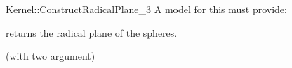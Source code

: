 \begin{ccRefFunctionObjectConcept}{Kernel::ConstructRadicalPlane_3}
A model for this must provide:


       {returns the radical plane of the spheres.
	}

\ccRefines
{} (with two argument)

\ccSeeAlso
{} \\

\end{ccRefFunctionObjectConcept}

